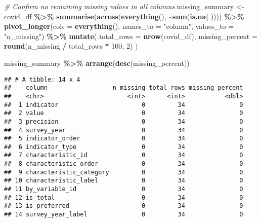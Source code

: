 \documentclass[
]{article}
\newenvironment{Shaded}{\begin{snugshade}}{\end{snugshade}}
\newcommand{\AttributeTok}[1]{\textcolor[rgb]{0.13,0.29,0.53}{#1}}
\newcommand{\CommentTok}[1]{\textcolor[rgb]{0.56,0.35,0.01}{\textit{#1}}}
\newcommand{\DecValTok}[1]{\textcolor[rgb]{0.00,0.00,0.81}{#1}}
\newcommand{\FunctionTok}[1]{\textcolor[rgb]{0.13,0.29,0.53}{\textbf{#1}}}
\newcommand{\NormalTok}[1]{#1}
\newcommand{\OtherTok}[1]{\textcolor[rgb]{0.56,0.35,0.01}{#1}}
\newcommand{\SpecialCharTok}[1]{\textcolor[rgb]{0.81,0.36,0.00}{\textbf{#1}}}
\newcommand{\StringTok}[1]{\textcolor[rgb]{0.31,0.60,0.02}{#1}}
\begin{document}
\begin{Shaded}
\begin{Highlighting}[]
\CommentTok{\# Confirm no remaining missing values in all columns}
\NormalTok{missing\_summary }\OtherTok{\textless{}{-}}\NormalTok{ covid\_df }\SpecialCharTok{\%\textgreater{}\%}
  \FunctionTok{summarise}\NormalTok{(}\FunctionTok{across}\NormalTok{(}\FunctionTok{everything}\NormalTok{(), }\SpecialCharTok{\textasciitilde{}}\FunctionTok{sum}\NormalTok{(}\FunctionTok{is.na}\NormalTok{(.)))) }\SpecialCharTok{\%\textgreater{}\%}
  \FunctionTok{pivot\_longer}\NormalTok{(}\AttributeTok{cols =} \FunctionTok{everything}\NormalTok{(), }\AttributeTok{names\_to =} \StringTok{"column"}\NormalTok{, }\AttributeTok{values\_to =} \StringTok{"n\_missing"}\NormalTok{) }\SpecialCharTok{\%\textgreater{}\%}
  \FunctionTok{mutate}\NormalTok{(}
    \AttributeTok{total\_rows =} \FunctionTok{nrow}\NormalTok{(covid\_df),}
    \AttributeTok{missing\_percent =} \FunctionTok{round}\NormalTok{(n\_missing }\SpecialCharTok{/}\NormalTok{ total\_rows }\SpecialCharTok{*} \DecValTok{100}\NormalTok{, }\DecValTok{2}\NormalTok{)}
\NormalTok{  )}

\NormalTok{missing\_summary }\SpecialCharTok{\%\textgreater{}\%} \FunctionTok{arrange}\NormalTok{(}\FunctionTok{desc}\NormalTok{(missing\_percent))}
\end{Highlighting}
\end{Shaded}

\begin{verbatim}
## # A tibble: 14 x 4
##    column                  n_missing total_rows missing_percent
##    <chr>                       <int>      <int>           <dbl>
##  1 indicator                       0         34               0
##  2 value                           0         34               0
##  3 precision                       0         34               0
##  4 survey_year                     0         34               0
##  5 indicator_order                 0         34               0
##  6 indicator_type                  0         34               0
##  7 characteristic_id               0         34               0
##  8 characteristic_order            0         34               0
##  9 characteristic_category         0         34               0
## 10 characteristic_label            0         34               0
## 11 by_variable_id                  0         34               0
## 12 is_total                        0         34               0
## 13 is_preferred                    0         34               0
## 14 survey_year_label               0         34               0
\end{verbatim}
\end{document}
